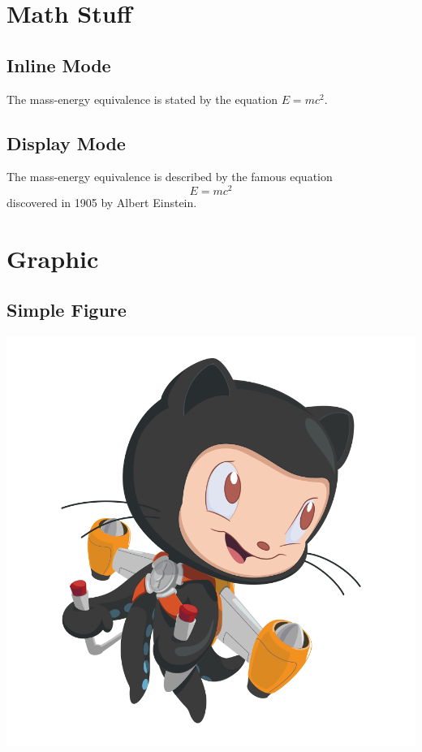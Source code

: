 \documentclass[12pt, letterpaper]{article}
\begin{document}
\section{Math Stuff}
\subsection{Inline Mode}
The mass-energy equivalence is stated by the equation $E=mc^2$.

\subsection{Display Mode}
The mass-energy equivalence is described by the famous equation
\[ E=mc^2 \]
discovered in 1905 by Albert Einstein. 

\section{Graphic}
\subsection{Simple Figure}
\includegraphics[scale = 0.2]{octocat.png} %

\end{document}

